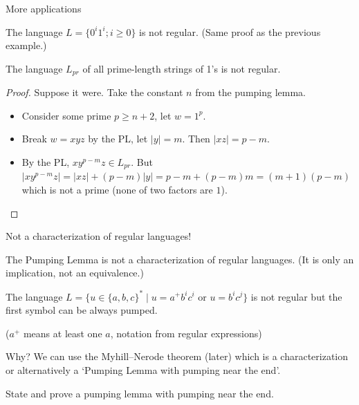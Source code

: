 \documentclass[handout]{beamer}
\begin{document}
\begin{frame}{More applications}

    \begin{example}
		The language $L=\{0^i1^i; i\geq 0\}$ is not regular. (Same proof as the previous example.)
	\end{example}
	
	\begin{example}
		The language $L_{pr}$ of all prime-length strings of 1's is not regular.
	\end{example}
	\begin{proof}
	Suppose it were. Take the constant $n$ from the pumping lemma.
	\begin{itemize}
		\item Consider some prime $p\geq n+2$, let $w=1^p$.
		\item Break $w=xyz$ by the PL, let $|y|=m$. Then $|xz|=p-m$.
		\item By the PL, $xy^{p-m}z\in L_{pr}$. But $|xy^{p-m}z|=|xz|+(p-m)|y|=p-m+(p-m)m=(m+1)(p-m)$ which is not a prime (none of two factors are $1$).
	\end{itemize}
    \vspace{-24pt}
	\end{proof}

\end{frame}


\begin{frame}{Not a characterization of regular languages!}

    The Pumping Lemma is not a \alert{characterization} of regular languages. (It is only an implication, not an equivalence.)
    
    \begin{example}
        The language $L=\{u\in\{a,b,c\}^*\mid u=a^+b^ic^i \text{ or } u=b^ic^j\}$ is not regular but the first symbol can be always pumped.
    \end{example}

    ($a^+$ means at least one $a$, notation from regular expressions)

    Why? We can use the \alert{Myhill--Nerode theorem} (later) which is a characterization or alternatively a `Pumping Lemma with \alert{pumping near the end}'.
    
    \begin{exercise}
        State and prove a pumping lemma with pumping near the end. 
    \end{exercise}    
    
\end{frame}
\end{document}
